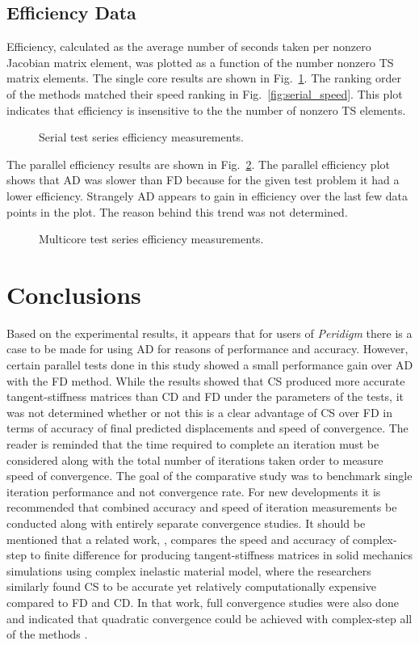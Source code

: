 \documentclass[preprint,12pt]{elsarticle}
\begin{document}
\subsection{Efficiency Data}
Efficiency, calculated as the average number of seconds taken per nonzero Jacobian matrix element, was plotted as a function of the number nonzero TS matrix elements. The single core results are shown in Fig.~\ref{fig:serial_efficiency}.  The ranking order of the methods
matched their speed ranking in Fig.~\ref{fig:serial_speed}. This plot indicates that efficiency is insensitive to the the number of nonzero TS elements.  
%
\begin{figure}[tbp]
  \centering
  \scalebox{1.0}{}
  \caption{Serial test series efficiency measurements.}
  \label{fig:serial_efficiency}
\end{figure}
%
The parallel efficiency results are shown in Fig.~\ref{fig:multi_efficiency}. The parallel efficiency plot shows that AD was slower than FD because for the given test problem it had a lower efficiency. Strangely AD appears to gain in efficiency over the last few data points in the plot. The reason behind this trend was not determined.
%
\begin{figure}[tbp]
  \centering
  \scalebox{1.0}{}
  \caption{Multicore test series efficiency measurements.}
  \label{fig:multi_efficiency}
\end{figure}


\section{Conclusions}
%
Based on the experimental results, it appears that for users of \emph{Peridigm} there is a case to be made for using AD for reasons of performance and accuracy. However, certain parallel tests done in this study showed a small performance gain over AD with the FD method.  While the results showed that CS produced more accurate tangent-stiffness matrices than CD and FD under the parameters of the tests, it was not determined whether or not this is a clear advantage of CS over FD in terms of accuracy of final predicted displacements and speed of convergence. The reader is reminded that the time required to complete an iteration must be considered along with the total number of iterations taken order to measure speed of convergence. The goal of the comparative study was to benchmark single iteration performance and not convergence rate. For new developments it is recommended that combined accuracy and speed of iteration measurements be conducted along with entirely separate convergence studies. It should be mentioned that a related work, \cite{perez2012numerical}, compares the speed and accuracy of complex-step to finite difference for producing tangent-stiffness matrices in solid mechanics simulations using complex inelastic material model, where the researchers similarly found CS to be accurate yet relatively computationally expensive compared to FD and CD. In that work, full convergence studies were also done and indicated that quadratic convergence could be achieved with complex-step all of the methods \cite[p.28]{perez2012numerical}.
\end{document}
